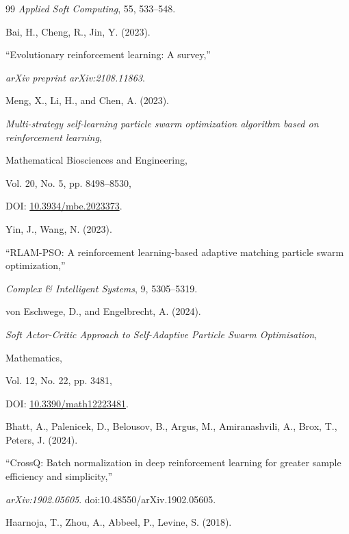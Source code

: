 \documentclass[fleqn,10pt]{wlscirep}
\begin{document}
\begin{thebibliography}{99}
\textit{Applied Soft Computing}, 55, 533--548.


Bai, H., Cheng, R., Jin, Y. (2023).

``Evolutionary reinforcement learning: A survey,''

\textit{arXiv preprint arXiv:2108.11863}.




Meng, X., Li, H., and Chen, A. (2023).

\emph{Multi-strategy self-learning particle swarm optimization algorithm based on reinforcement learning},

Mathematical Biosciences and Engineering,

Vol. 20, No. 5, pp. 8498--8530,

DOI: \href{https://doi.org/10.3934/mbe.2023373}{10.3934/mbe.2023373}.




Yin, J., Wang, N. (2023).

``RLAM-PSO: A reinforcement learning-based adaptive matching particle swarm optimization,''

\textit{Complex \& Intelligent Systems}, 9, 5305--5319.




von Eschwege, D., and Engelbrecht, A. (2024).

\emph{Soft Actor-Critic Approach to Self-Adaptive Particle Swarm Optimisation},

Mathematics,

Vol. 12, No. 22, pp. 3481,

DOI: \href{https://doi.org/10.3390/math12223481}{10.3390/math12223481}.




Bhatt, A., Palenicek, D., Belousov, B., Argus, M., Amiranashvili, A., Brox, T., Peters, J. (2024).

``CrossQ: Batch normalization in deep reinforcement learning for greater sample efficiency and simplicity,''

\textit{arXiv:1902.05605}. doi:10.48550/arXiv.1902.05605.




Haarnoja, T., Zhou, A., Abbeel, P., Levine, S. (2018).


\end{thebibliography}
\end{document}

